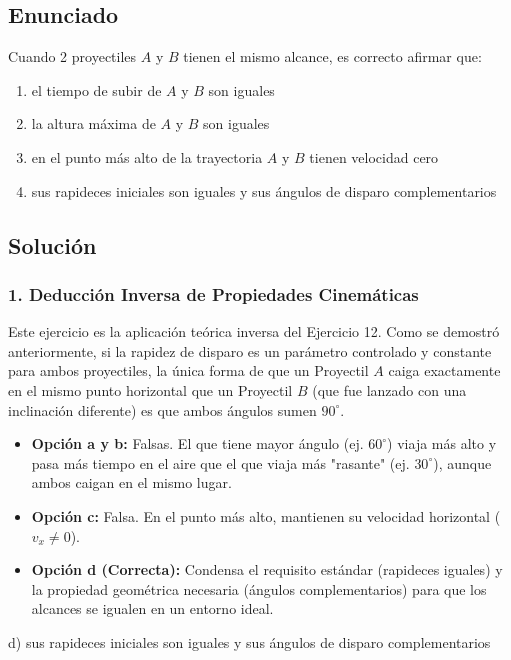 \documentclass[12pt, a4paper]{article}
\begin{document}
\newpage

\subsection*{Enunciado}
Cuando 2 proyectiles $A$ y $B$ tienen el mismo alcance, es correcto afirmar que:
\begin{enumerate}[label=\alph*)]
    \item el tiempo de subir de $A$ y $B$ son iguales
    \item la altura máxima de $A$ y $B$ son iguales
    \item en el punto más alto de la trayectoria $A$ y $B$ tienen velocidad cero
    \item sus rapideces iniciales son iguales y sus ángulos de disparo complementarios
\end{enumerate}

\subsection*{Solución}

\subsubsection*{1. Deducción Inversa de Propiedades Cinemáticas}
Este ejercicio es la aplicación teórica inversa del Ejercicio 12. 
Como se demostró anteriormente, si la rapidez de disparo es un parámetro controlado y constante para ambos proyectiles, la única forma de que un Proyectil $A$ caiga exactamente en el mismo punto horizontal que un Proyectil $B$ (que fue lanzado con una inclinación diferente) es que ambos ángulos sumen $90^\circ$. 

\begin{itemize}
    \item \textbf{Opción a y b:} Falsas. El que tiene mayor ángulo (ej. $60^\circ$) viaja más alto y pasa más tiempo en el aire que el que viaja más "rasante" (ej. $30^\circ$), aunque ambos caigan en el mismo lugar.
    \item \textbf{Opción c:} Falsa. En el punto más alto, mantienen su velocidad horizontal ($v_x \neq 0$).
    \item \textbf{Opción d (Correcta):} Condensa el requisito estándar (rapideces iguales) y la propiedad geométrica necesaria (ángulos complementarios) para que los alcances se igualen en un entorno ideal.
\end{itemize}

\begin{tcolorbox}[colback=green!5!white, colframe=green!50!black, title=Respuesta Final]
\centering \Large d) sus rapideces iniciales son iguales y sus ángulos de disparo complementarios
\end{tcolorbox}
\end{document}
